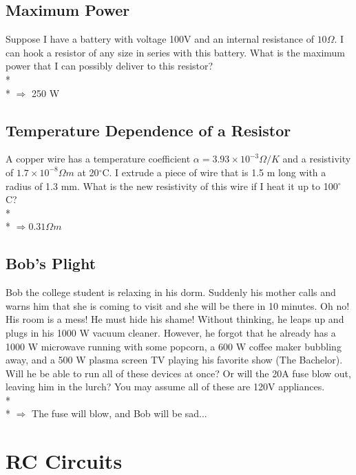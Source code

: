 \documentclass[11pt]{article}
\begin{document}
\subsection{Maximum Power}
Suppose I have a battery with voltage 100V and an internal resistance of $10\Omega$.  I can hook a resistor of any size in series with this battery.  What is the maximum power that I can possibly deliver to this resistor?\\* \\*
$\Rightarrow$ 250 W

\subsection{Temperature Dependence of a Resistor}
A copper wire has a temperature coefficient $\alpha = 3.93 \times 10^{-3} \Omega/K$ and a resistivity of $1.7 \times 10^{-8} \Omega m$ at 20$^\circ$C.  I extrude a piece of wire that is 1.5 m long with a radius of 1.3 mm.  What is the new resistivity of this wire if I heat it up to 100$^\circ$C?\\* \\*
$\Rightarrow 0.31 \Omega m$

\subsection{Bob's Plight}
Bob the college student is relaxing in his dorm.  Suddenly his mother calls and warns him that she is coming to visit and she will be there in 10 minutes.  Oh no!  His room is a mess!  He must hide his shame!  Without thinking, he leaps up and plugs in his 1000 W vacuum cleaner.  However, he forgot that he already has a 1000 W microwave running with some popcorn, a 600 W coffee maker bubbling away, and a 500 W plasma screen TV playing his favorite show (The Bachelor).  Will he be able to run all of these devices at once?  Or will the 20A fuse blow out, leaving him in the lurch?  You may assume all of these are 120V appliances.\\* \\*
$\Rightarrow$ The fuse will blow, and Bob will be sad...


\pagebreak
\section{RC Circuits}
\vspace{10pt}
\end{document}
